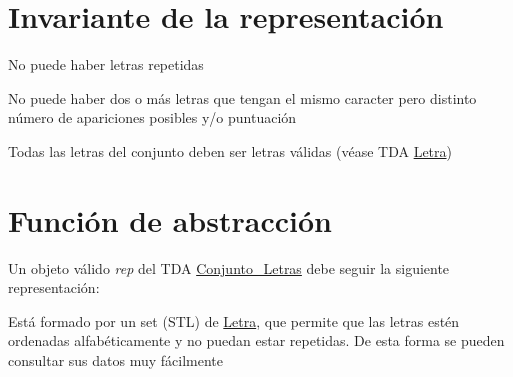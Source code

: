\hypertarget{repConjunto_Letras_invConjunto_Letras}{}\section{Invariante de la representación}\label{repConjunto_Letras_invConjunto_Letras}

\begin{DoxyItemize}
\item No puede haber letras repetidas
\item No puede haber dos o más letras que tengan el mismo caracter pero distinto número de apariciones posibles y/o puntuación
\item Todas las letras del conjunto deben ser letras válidas (véase T\+DA \hyperlink{classLetra}{Letra}) 
\end{DoxyItemize}\hypertarget{repConjunto_Letras_faConjunto_Letras}{}\section{Función de abstracción}\label{repConjunto_Letras_faConjunto_Letras}
Un objeto válido {\itshape rep} del T\+DA \hyperlink{classConjunto__Letras}{Conjunto\+\_\+\+Letras} debe seguir la siguiente representación\+:
\begin{DoxyItemize}
\item Está formado por un set (S\+TL) de \hyperlink{classLetra}{Letra}, que permite que las letras estén ordenadas alfabéticamente y no puedan estar repetidas. De esta forma se pueden consultar sus datos muy fácilmente 
\end{DoxyItemize}